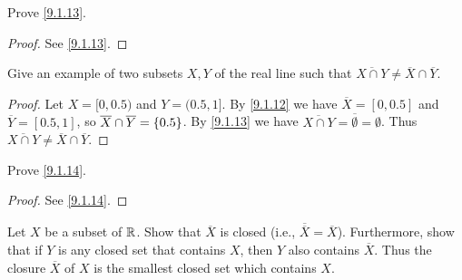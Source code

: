 \begin{ex}\label{ex:9.1.3}
	Prove \cref{9.1.13}.
\end{ex}

\begin{proof}
	See \cref{9.1.13}.
\end{proof}

\begin{ex}\label{ex:9.1.4}
	Give an example of two subsets \(X, Y\) of the real line such that \(\overline{X \cap Y} \neq \overline{X} \cap \overline{Y}\).
\end{ex}

\begin{proof}
	Let \(X = [0, 0.5)\) and \(Y = (0.5, 1]\).
	By \cref{9.1.12} we have \(\overline{X} = [0, 0.5]\) and \(\overline{Y} = [0.5, 1]\), so \(\overline{X} \cap \overline{Y} = \left\lbrace0.5\right\rbrace\).
	By \cref{9.1.13} we have \(\overline{X \cap Y} = \overline{\emptyset} = \emptyset\).
	Thus \(\overline{X \cap Y} \neq \overline{X} \cap \overline{Y}\).
\end{proof}

\begin{ex}\label{ex:9.1.5}
	Prove \cref{9.1.14}.
\end{ex}

\begin{proof}
	See \cref{9.1.14}.
\end{proof}

\begin{ex}\label{ex:9.1.6}
	Let \(X\) be a subset of \(\mathbb{R}\).
	Show that \(\overline{X}\) is closed (i.e., \(\overline{\overline{X}} = \overline{X}\)).
	Furthermore, show that if \(Y\) is any closed set that contains \(X\), then \(Y\) also contains \(\overline{X}\).
	Thus the closure \(\overline{X}\) of \(X\) is the smallest closed set which contains \(X\).
\end{ex}

